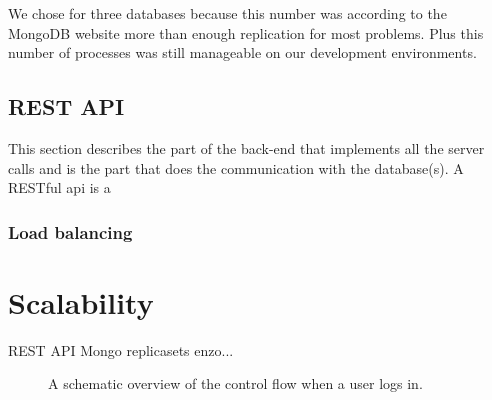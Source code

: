 We chose for three databases because this number was according to the MongoDB website more than enough replication for most problems. Plus this number of processes was still manageable on our development environments.

\subsection{REST API}
\label{ssec:2:restapi}
This section describes the part of the back-end that implements all the server calls and is the part that does the communication with the database(s). A RESTful api is a 


\subsubsection{Load balancing}
\label{sssec:2:loadbalancing}

\section{Scalability}
REST API
Mongo replicasets enzo...

\begin{figure}
    \caption{A schematic overview of the control flow when a user logs in.}
    \label{fig:2:overview}
\end{figure}
